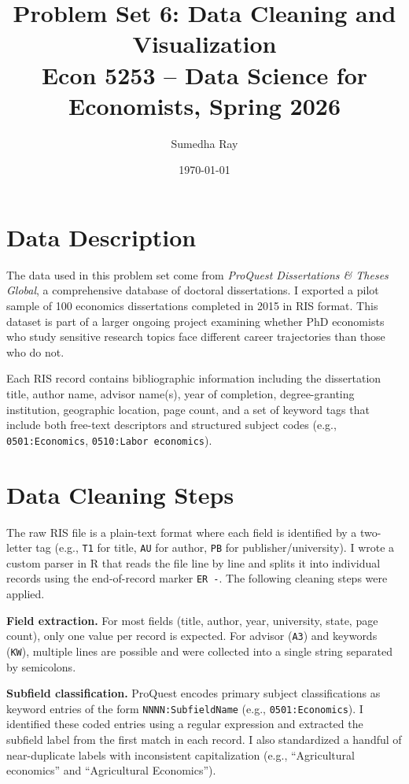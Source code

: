 \documentclass[12pt]{article}
\title{\textbf{Problem Set 6: Data Cleaning and Visualization} \\
       \large Econ 5253 -- Data Science for Economists, Spring 2026}
\author{Sumedha Ray}
\date{\today}
\begin{document}
\maketitle

\section{Data Description}

The data used in this problem set come from \textit{ProQuest Dissertations \& Theses Global}, a comprehensive database of doctoral dissertations. I exported a pilot sample of 100 economics dissertations completed in 2015 in RIS format. This dataset is part of a larger ongoing project examining whether PhD economists who study sensitive research topics face different career trajectories than those who do not.

Each RIS record contains bibliographic information including the dissertation title, author name, advisor name(s), year of completion, degree-granting institution, geographic location, page count, and a set of keyword tags that include both free-text descriptors and structured subject codes (e.g., \texttt{0501:Economics}, \texttt{0510:Labor economics}).

\section{Data Cleaning Steps}

The raw RIS file is a plain-text format where each field is identified by a two-letter tag (e.g., \texttt{T1} for title, \texttt{AU} for author, \texttt{PB} for publisher/university). I wrote a custom parser in R that reads the file line by line and splits it into individual records using the end-of-record marker \texttt{ER  -}. The following cleaning steps were applied.

\textbf{Field extraction.} For most fields (title, author, year, university, state, page count), only one value per record is expected. For advisor (\texttt{A3}) and keywords (\texttt{KW}), multiple lines are possible and were collected into a single string separated by semicolons.

\textbf{Subfield classification.} ProQuest encodes primary subject classifications as keyword entries of the form \texttt{NNNN:SubfieldName} (e.g., \texttt{0501:Economics}). I identified these coded entries using a regular expression and extracted the subfield label from the first match in each record. I also standardized a handful of near-duplicate labels with inconsistent capitalization (e.g., ``Agricultural economics'' and ``Agricultural Economics'').
\end{document}
